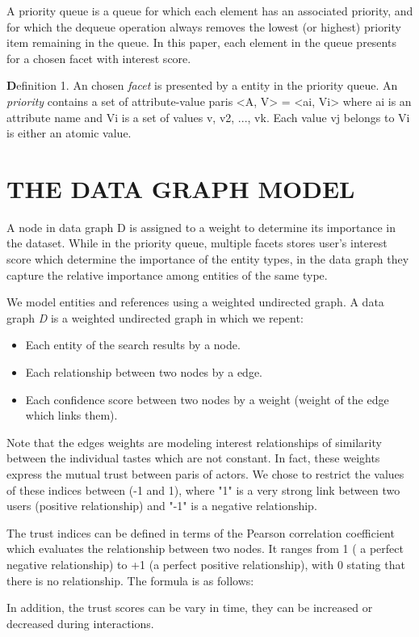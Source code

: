 A priority queue is a queue for which each element has an associated priority, and for which the dequeue operation always removes the lowest (or highest) priority item remaining in the queue. In this paper, each element in the queue presents for a chosen facet with interest score. 

{\textbf Definition 1.} An chosen {\it facet} is presented by a entity in the priority queue. An {\it priority} contains a set of attribute-value paris <A, V> = {<ai, Vi>} where ai is an attribute name and Vi is a set of values {v, v2, ..., vk}. Each value vj belongs to Vi is either an atomic value.

\section{THE DATA GRAPH MODEL}
A node in data graph D is assigned to a weight to determine its importance in the dataset. While in the priority queue, multiple facets stores user's interest score which determine the importance of the entity types, in the data graph they capture the relative importance among entities of the same type. 

We model entities and references using a weighted undirected graph. A data graph {\it D} is a weighted undirected graph in which we repent:
\begin{itemize}
	\item Each entity of the search results by a node.
	\item Each relationship between two nodes by a edge.
	\item Each confidence score between two nodes by a weight (weight of the edge which links them).
\end{itemize}
Note that the edges weights are modeling interest relationships of similarity between the individual tastes which are not constant. In fact, these weights express the mutual trust between paris of actors. We chose to restrict the values of these indices between (-1 and 1), where "1" is a very strong link between two users (positive relationship) and "-1" is a negative relationship.

The trust indices can be defined in terms of the Pearson correlation coefficient \cite{Leung2007} which evaluates the relationship between two nodes. It ranges from 1 ( a perfect negative relationship) to +1 (a perfect positive relationship), with 0 stating that there is no relationship. The formula is as follows:

In addition, the trust scores can be vary in time, they can be increased or decreased during interactions.
